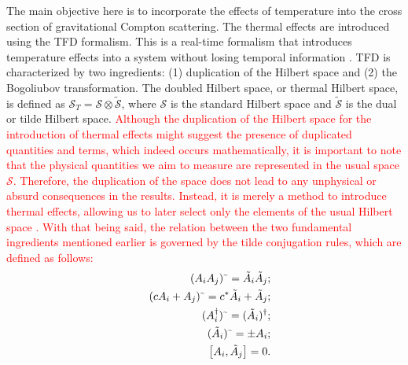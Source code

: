 \documentclass[11pt,showpacs,preprintnumbers,amsmath,amssymb,prd,nofootinbib,superscriptaddress]{revtex4-2}
\newcommand{\til}{\text{\textasciitilde}}
\begin{document}
The main objective here is to incorporate the effects of temperature into the cross section of gravitational Compton scattering. The thermal effects are introduced using the TFD formalism. This is a real-time formalism that introduces temperature effects into a system without losing temporal information \textcolor{red}{\cite{Umezawa1, Umezawa2, Book, Umezawa22, Khanna1, Khanna2, Santana1, Santana2}}. TFD is characterized by two ingredients: (1) duplication of the Hilbert space and (2) the Bogoliubov transformation. The doubled Hilbert space, or thermal Hilbert space, is defined as $\mathcal{S}_T = \mathcal{S} \otimes \tilde{\mathcal{S}}$, where $\mathcal{S}$ is the standard Hilbert space and $\tilde{\mathcal{S}}$ is the dual or tilde Hilbert space. \textcolor{red}{Although the duplication of the Hilbert space for the introduction of thermal effects might suggest the presence of duplicated quantities and terms, which indeed occurs mathematically, it is important to note that the physical quantities we aim to measure are represented in the usual space $\mathcal{S}$. Therefore, the duplication of the space does not lead to any unphysical or absurd consequences in the results. Instead, it is merely a method to introduce thermal effects, allowing us to later select only the elements of the usual Hilbert space \cite{Book, das2023finite}. With that being said, the relation between the two fundamental ingredients mentioned earlier is governed by the tilde conjugation rules, which are defined as follows:}
\begin{eqnarray}
    &&(A_iA_j)^\til=\Tilde{A}_i\Tilde{A}_j;\nonumber\\
    &&(cA_i+A_j)^\til=c^*\Tilde{A}_i+\Tilde{A}_j;\nonumber\\
    &&(A_i^\dagger)^\til=(\Tilde{A}_i)^\dagger;\\
    &&(\Tilde{A}_i)^\til=\pm A_i;\nonumber\\
   &&\comm{A_i}{\Tilde{A}_j}=0.\nonumber
\end{eqnarray}	
\end{document}
